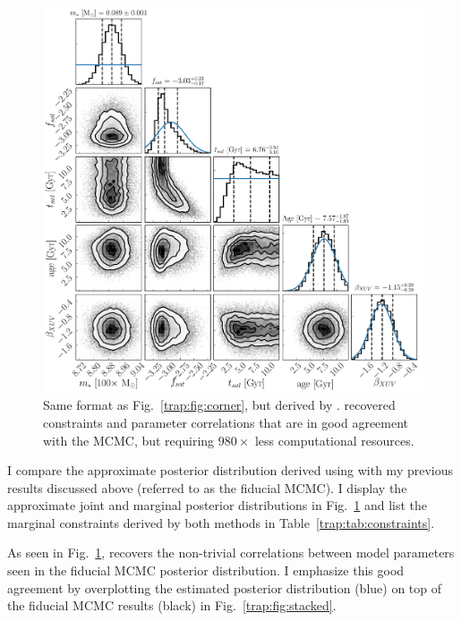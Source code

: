 \begin{figure}
\centering
	\includegraphics[width=\textwidth]{apCorner.pdf}
   \caption{Same format as Fig.~\ref{trap:fig:corner}, but derived by \approxposterior. \approxposterior recovered constraints and parameter correlations that are in good agreement with the \emcee MCMC, but requiring $980\times$ less computational resources.}%
    \label{trap:fig:approx}%
\end{figure}

I compare the approximate posterior distribution derived using \approxposterior with my previous results discussed above (referred to as the fiducial MCMC). I display the approximate joint and marginal posterior distributions in Fig.~\ref{trap:fig:approx} and list the marginal constraints derived by both methods in Table~\ref{trap:tab:constraints}.

As seen in Fig.~\ref{trap:fig:approx}, \approxposterior recovers the non-trivial correlations between model parameters seen in the fiducial MCMC posterior distribution. I emphasize this good agreement by overplotting the \approxposterior estimated posterior distribution (blue) on top of the fiducial MCMC results (black) in Fig.~\ref{trap:fig:stacked}.

